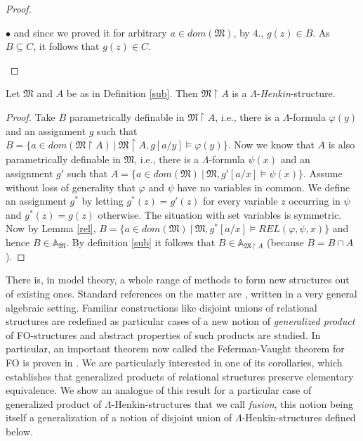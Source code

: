 \documentclass{LMCS}
\newcommand{\frM}{\mathfrak{M}}
\newcommand{\fo}{\textsf{FO}\xspace}
\begin{document}
\begin{proof}
\begin{iteMize}{$\bullet$}
and since we proved it for arbitrary $a \in dom(\frM)$, by $4.$, $g(z) \in B$. As $B \subseteq C$, it follows that $g(z)\in C$.
\end{iteMize}
\end{proof}

\begin{thm}
Let $\frM$ and $A$ be as in Definition \ref{sub}. Then $\frM \upharpoonright A$ is a $\Lambda$-\emph{Henkin}-structure.
\end{thm}

\begin{proof}
Take $B$ parametrically definable in $\frM \upharpoonright A$,
i.e., there is a $\Lambda$-formula $\varphi(y)$ and an assignment
$g$ such that $B=\{a \in dom(\frM \upharpoonright A)~|~\frM
\upharpoonright A,g[a/y]\models \varphi(y)\}$. Now we know that
$A$ is also parametrically definable in $\frM$, i.e., there is a
$\Lambda$-formula $\psi(x)$ and an assignment $g'$ such that
$A=\{a \in dom(\frM) ~|~\frM,g'[a/x]\models \psi(x)\}$. Assume
without loss of generality that $\varphi$ and $\psi$ have no variables in common. We
define an assignment $g^*$ by letting $g^*(z)=g'(z)$ for every
variable $z$ occurring in $\psi$ and $g^*(z)=g(z)$ otherwise. The
situation with set variables is symmetric. Now by Lemma \ref{rel},
$B=\{a \in dom(\frM)~|~\frM,g^*[a/x]\models REL(\varphi,\psi,x)\}$
and hence $B \in \mathbb{A}_\frM$. By definition \ref{sub} it follows that $B \in  \mathbb{A}_{\frM \upharpoonright A}$ (because $B=B\cap A$).
\end{proof}
There is, in model theory, a whole range of methods to form new structures out of
existing ones. Standard references on the matter are \cite{1959,2004}, written in a very general algebraic setting.
Familiar constructions like disjoint unions of relational structures are redefined as particular cases of a new notion of
\emph{generalized product} of \fo-structures and abstract properties of such products are studied. In particular, an important
theorem now called the Feferman-Vaught theorem for \fo is proven in  \cite{1959}. We are particularly interested in one of its corollaries, which
establishes that generalized products of relational structures preserve elementary equivalence. We show an
analogue of this result for a particular case of generalized product of $\Lambda$-Henkin-structures that we call \emph{fusion}, this notion
being itself a generalization of a notion of disjoint union of $\Lambda$-Henkin-structures defined below.
\end{document}
